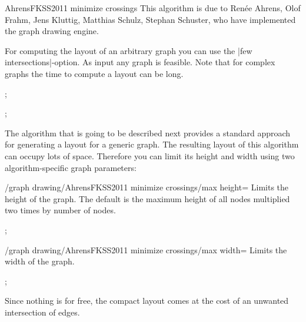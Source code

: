 \begin{gdalgorithm}{AhrensFKSS2011 minimize crossings}
  This algorithm is due to  Ren\'ee Ahrens, Olof Frahm, Jens Kluttig,
  Matthias Schulz, Stephan Schuster, who have implemented the graph
  drawing engine.

  For computing the layout of an arbitrary graph you can use the
  |few intersections|-option. As input any graph is feasible. Note
  that for complex graphs the time to compute a layout can be long. 

\begin{codeexample}[]
\tikz [AhrensFKSS2011 minimize crossings, scale=2]
  ;
\end{codeexample}

\begin{codeexample}[]
\tikz [AhrensFKSS2011 minimize crossings, scale=2]
  ;
\end{codeexample}

  The algorithm that is going to be described next provides a standard
  approach for generating a layout for a generic graph. The resulting
  layout of this algorithm can occupy lots of space. Therefore you can
  limit its height and width using two algorithm-specific graph
  parameters: 

  \begin{key}{/graph drawing/AhrensFKSS2011 minimize crossings/max
      height=}
    Limits the height of the graph. The default is the maximum height
    of all nodes multiplied two times by number of nodes.
\begin{codeexample}[]
\tikz [AhrensFKSS2011 minimize crossings={max height=50pt}, scale=2]
  ;
\end{codeexample}
  \end{key}

  \begin{key}{/graph drawing/AhrensFKSS2011 minimize crossings/max
      width=} 
    Limits the width of the graph.
\begin{codeexample}[]
\tikz [AhrensFKSS2011 minimize crossings={ max width=50pt, max height=50pt},
       scale=2]
  ;
\end{codeexample}
    Since nothing is for free, the compact layout comes at the cost of
    an unwanted intersection of edges. 
  \end{key}


\end{gdalgorithm}
